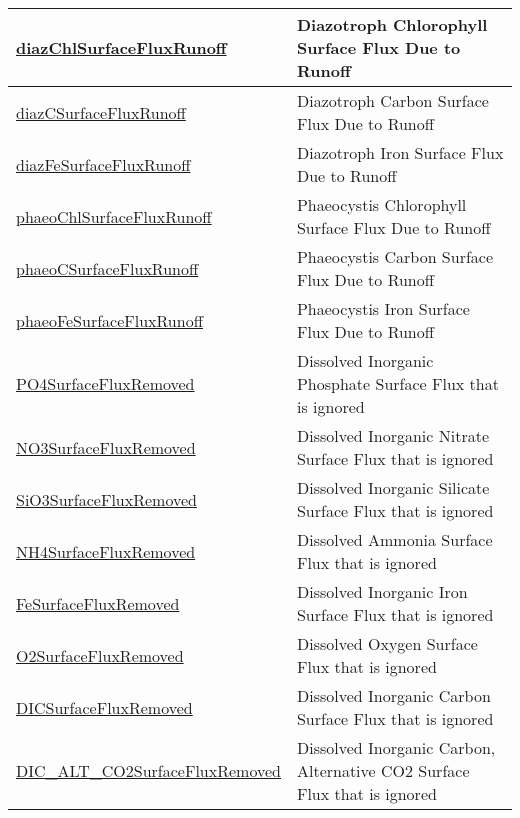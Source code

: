 {\begin{center}
\begin{longtable}{| p{2.0in} | p{4.0in} |}
    \hline
    \hyperref[subsec:var_sec_forcing_diazChlSurfaceFluxRunoff]{diazChlSurfaceFluxRunoff} & Diazotroph Chlorophyll Surface Flux Due to Runoff \\
    \hline
    \hyperref[subsec:var_sec_forcing_diazCSurfaceFluxRunoff]{diazCSurfaceFluxRunoff} & Diazotroph Carbon Surface Flux Due to Runoff \\
    \hline
    \hyperref[subsec:var_sec_forcing_diazFeSurfaceFluxRunoff]{diazFeSurfaceFluxRunoff} & Diazotroph Iron Surface Flux Due to Runoff \\
    \hline
    \hyperref[subsec:var_sec_forcing_phaeoChlSurfaceFluxRunoff]{phaeoChlSurfaceFluxRunoff} & Phaeocystis Chlorophyll Surface Flux Due to Runoff \\
    \hline
    \hyperref[subsec:var_sec_forcing_phaeoCSurfaceFluxRunoff]{phaeoCSurfaceFluxRunoff} & Phaeocystis Carbon Surface Flux Due to Runoff \\
    \hline
    \hyperref[subsec:var_sec_forcing_phaeoFeSurfaceFluxRunoff]{phaeoFeSurfaceFluxRunoff} & Phaeocystis Iron Surface Flux Due to Runoff \\
    \hline
    \hyperref[subsec:var_sec_forcing_PO4SurfaceFluxRemoved]{PO4SurfaceFluxRemoved} & Dissolved Inorganic Phosphate Surface Flux that is ignored \\
    \hline
    \hyperref[subsec:var_sec_forcing_NO3SurfaceFluxRemoved]{NO3SurfaceFluxRemoved} & Dissolved Inorganic Nitrate Surface Flux that is ignored \\
    \hline
    \hyperref[subsec:var_sec_forcing_SiO3SurfaceFluxRemoved]{SiO3SurfaceFluxRemoved} & Dissolved Inorganic Silicate Surface Flux that is ignored \\
    \hline
    \hyperref[subsec:var_sec_forcing_NH4SurfaceFluxRemoved]{NH4SurfaceFluxRemoved} & Dissolved Ammonia Surface Flux that is ignored \\
    \hline
    \hyperref[subsec:var_sec_forcing_FeSurfaceFluxRemoved]{FeSurfaceFluxRemoved} & Dissolved Inorganic Iron Surface Flux that is ignored \\
    \hline
    \hyperref[subsec:var_sec_forcing_O2SurfaceFluxRemoved]{O2SurfaceFluxRemoved} & Dissolved Oxygen Surface Flux that is ignored \\
    \hline
    \hyperref[subsec:var_sec_forcing_DICSurfaceFluxRemoved]{DICSurfaceFluxRemoved} & Dissolved Inorganic Carbon Surface Flux that is ignored \\
    \hline
    \hyperref[subsec:var_sec_forcing_DIC_ALT_CO2SurfaceFluxRemoved]{DIC\_ALT\_CO2SurfaceFlux\-Removed} & Dissolved Inorganic Carbon, Alternative CO2 Surface Flux that is ignored \\

\end{longtable}
\end{center}}
